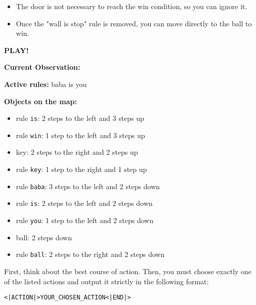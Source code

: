 \begin{GreenBox}
\begin{itemize}
		\item The door is not necessary to reach the win condition, so you can
			ignore it.

		\item Once the "wall is stop" rule is removed, you can move directly to the
			ball to win.
	\end{itemize}

	\textbf{PLAY!}

	\textbf{Current Observation:}

	\textbf{Active rules:} baba is you

	\textbf{Objects on the map:}
	\begin{itemize}
		\item rule \texttt{is}: 2 steps to the left and 3 steps up

		\item rule \texttt{win}: 1 step to the left and 3 steps up

		\item key: 2 steps to the right and 2 steps up

		\item rule \texttt{key}: 1 step to the right and 1 step up

		\item rule \texttt{baba}: 3 steps to the left and 2 steps down

		\item rule \texttt{is}: 2 steps to the left and 2 steps down

		\item rule \texttt{you}: 1 step to the left and 2 steps down

		\item ball: 2 steps down

		\item rule \texttt{ball}: 2 steps to the right and 2 steps down
	\end{itemize}

	First, think about the best course of action. Then, you must choose exactly
	one of the listed actions and output it strictly in the following format:

	\texttt{<|ACTION|>YOUR\_CHOSEN\_ACTION<|END|>}
\end{GreenBox}
\newpage
